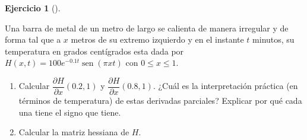 \documentclass[
  a4paper,
]{scrreport}
\theoremstyle{definition}
\newtheorem{exercise}{Ejercicio}[chapter]
\theoremstyle{remark}
\begin{document}
\begin{exercise}[]\protect\hypertarget{exr-barra-metal}{}\label{exr-barra-metal}

Una barra de metal de un metro de largo se calienta de manera irregular
y de forma tal que a \(x\) metros de su extremo izquierdo y en el
instante \(t\) minutos, su temperatura en grados centígrados esta dada
por \(H(x,t) = 100e^{-0.1t}\operatorname{sen}(\pi xt)\) con
\(0\leq x \leq 1\).

\begin{enumerate}
\def\labelenumi{\alph{enumi}.}
\item
  Calcular \(\dfrac{\partial H}{\partial x}(0.2, 1)\) y
  \(\dfrac{\partial H}{\partial x}(0.8, 1).\) ¿Cuál es la interpretación
  práctica (en términos de temperatura) de estas derivadas parciales?
  Explicar por qué cada una tiene el signo que tiene.
\item
  Calcular la matriz hessiana de \(H\).
\end{enumerate}

\end{exercise}
\end{document}
